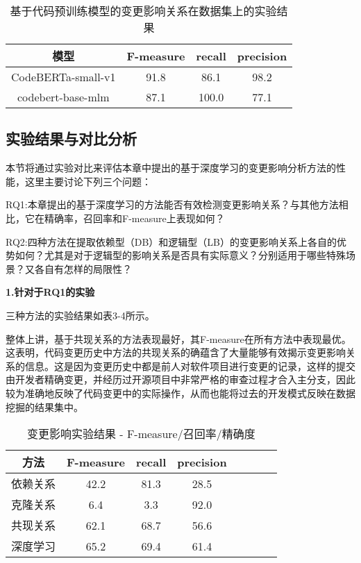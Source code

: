     \begin{table}[htbp]
    \caption{基于代码预训练模型的变更影响关系在数据集上的实验结果}
    \vspace{0.5em}\centering\wuhao
    \begin{tabular}{cccc}
    \toprule
    模型& F-measure & recall & precision \\
    \midrule
    CodeBERTa-small-v1 & 91.8 & 86.1 & 98.2 \\
    codebert-base-mlm  & 87.1 & 100.0  & 77.1 \\
    \bottomrule
    \end{tabular}
    \end{table}

\subsection{实验结果与对比分析}

本节将通过实验对比来评估本章中提出的基于深度学习的变更影响分析方法的性能，这里主要讨论下列三个问题：

RQ1:本章提出的基于深度学习的方法能否有效检测变更影响关系？与其他方法相比，它在精确率，召回率和F-measure上表现如何？

RQ2:四种方法在提取依赖型（DB）和逻辑型（LB）的变更影响关系上各自的优势如何？尤其是对于逻辑型的影响关系是否具有实际意义？分别适用于哪些特殊场景？又各自有怎样的局限性？


\textbf{1.针对于RQ1的实验}

三种方法的实验结果如表3-4所示。


整体上讲，基于共现关系的方法表现最好，其F-measure在所有方法中表现最优。这表明，代码变更历史中方法的共现关系的确蕴含了大量能够有效揭示变更影响关系的信息。这是因为变更历史中都是前人对软件项目进行变更的记录，这样的提交由开发者精确变更，并经历过开源项目中非常严格的审查过程才合入主分支，因此较为准确地反映了代码变更中的实际操作，从而也能将过去的开发模式反映在数据挖掘的结果集中。

\begin{table}[htbp]
\caption{变更影响实验结果 - F-measure/召回率/精确度}
\vspace{0.5em}\centering\wuhao
\begin{tabular}{cccccccc}
\toprule
方法 & F-measure & recall & precision  \\
\midrule
依赖关系 & 42.2 & 81.3 & 28.5  \\
克隆关系 & 6.4 & 3.3 &  92.0 \\
共现关系 & 62.1 & 68.7 & 56.6 \\
深度学习 & 65.2 & 69.4 & 61.4 \\
\bottomrule
\end{tabular}
\end{table}

